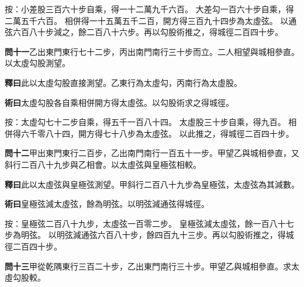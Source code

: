 \documentclass[12pt,a4paper]{article}
\begin{document}
\noindent
按：小差股三百六十步自乘，得一十二萬九千六百。
大差勾一百六十步自乘，得二萬五千六百。
相併得一十五萬五千二百，開方得三百九十四步為太虛弦。
以通弦六百八十步減之，餘二百八十六步。再以勾股術推之，得城徑二百四十步。

\vspace{0.5em}

\noindent\textbf{問十一}\quad 乙出東門東行七十二步，丙出南門南行三十步而立。二人相望與城相參直。以太虛勾股測望。

\vspace{0.3em}

\noindent\textbf{釋曰}\quad 此以太虛勾股直接測望。乙東行為太虛勾，丙南行為太虛股。

\vspace{0.3em}

\noindent\textbf{術曰}\quad 太虛勾股各自乘相併開方得太虛弦。以勾股術求之得城徑。

\vspace{0.3em}

\noindent
按：太虛勾七十二步自乘，得五千一百八十四。
太虛股三十步自乘，得九百。
相併得六千零八十四，開方得七十八步為太虛弦。
以此推之，得城徑二百四十步。

\vspace{0.5em}

\noindent\textbf{問十二}\quad 甲出東門東行二百步，乙出南門南行一百五十一步。甲望乙與城相參直，又斜行二百八十九步與乙相會。以太虛弦與皇極弦相較。

\vspace{0.3em}

\noindent\textbf{釋曰}\quad 此以太虛弦與皇極弦測望。甲斜行二百八十九步為皇極弦，太虛弦為其減數。

\vspace{0.3em}

\noindent\textbf{術曰}\quad 皇極弦減太虛弦，餘為明弦。以明弦減通弦得城徑。

\vspace{0.3em}

\noindent
按：皇極弦二百八十九步，太虛弦一百零二步。
皇極弦減太虛弦，餘一百八十七步為明弦。
以明弦減通弦六百八十步，餘四百九十三步。再以勾股術推之，得城徑二百四十步。

\vspace{0.5em}

\noindent\textbf{問十三}\quad 甲從乾隅東行三百二十步，乙出東門南行三十步。甲望乙與城相參直。求太虛勾股較。

\vspace{0.3em}
\end{document}
